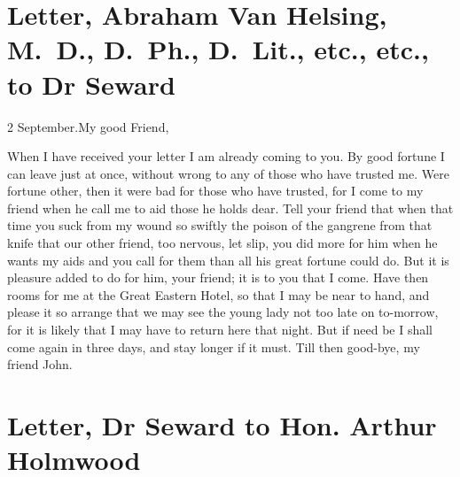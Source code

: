 \section{Letter, Abraham Van Helsing, M\@.~D\@., D\@.~Ph., D\@.~Lit., etc., etc., to Dr Seward}


\begin{mail}{2 September.}{My good Friend,}

When I have received your letter I am already coming to you. By good fortune I can leave just at once, without wrong to any of those who have trusted me. Were fortune other, then it were bad for those who have trusted, for I come to my friend when he call me to aid those he holds dear. Tell your friend that when that time you suck from my wound so swiftly the poison of the gangrene from that knife that our other friend, too nervous, let slip, you did more for him when he wants my aids and you call for them than all his great fortune could do. But it is pleasure added to do for him, your friend; it is to you that I come. Have then rooms for me at the Great Eastern Hotel, so that I may be near to hand, and please it so arrange that we may see the young lady not too late on to-morrow, for it is likely that I may have to return here that night. But if need be I shall come again in three days, and stay longer if it must. Till then good-bye, my friend John.

\end{mail}

\section{Letter, Dr Seward to Hon. Arthur Holmwood}

